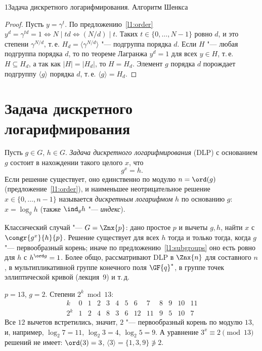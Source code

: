 \begin{lecture}{1}{Задача дискретного логарифмирования. Алгоритм Шенкса}
\begin{proof}
Пусть $y = \gamma^t$. По предложению~\ref{l1:order} $y^d = \gamma^{td} = 1 \iff N \mid td \iff
(N/d) \mid t$. Таких $t \in \{0, \dots, N - 1\}$ ровно $d$, и это степени $\gamma^{N/d}$,
т.\,е. $H_d = \langle \gamma^{N/d} \rangle$ "--- подгруппа порядка $d$. Если $H$ "--- любая
подгруппа порядка $d$, то по теореме Лагранжа $y^d = 1$ для всех $y \in H$, т.\,е.
$H \subseteq H_d$, а так как $|H| = |H_d|$, то $H = H_d$. Элемент $g$ порядка $d$ порождает
подгруппу $\langle g \rangle$ порядка $d$, т.\,е. $\langle g \rangle = H_d$.
\end{proof}


\section{Задача дискретного логарифмирования}

\begin{definition}
Пусть $g \in G$, $h \in G$. \emph{Задача дискретного логарифмирования} (DLP) с основанием $g$
состоит в нахождении такого целого $x$, что
\[
  g^x = h.
\]
Если решение существует, оно единственно по модулю $n = \ord(g)$ (предложение~\ref{l1:order}),
и наименьшее неотрицательное решение $x \in \{0, \dots, n - 1\}$ называется \emph{дискретным
логарифмом} $h$ по основанию $g$: $x = \log_g h$ (также $\ind_g h$ "--- \emph{индекс}).
\end{definition}

Классический случай "--- $G = \Znx{p}$: дано простое $p$ и вычеты $g, h$, найти $x$ с
$\congr{g^x}{h}{p}$. Решение существует для всех $h$ тогда и только тогда, когда $g$ "---
первообразный корень; иначе по предложению~\ref{l1:subgroups} оно есть ровно для $h$ с
$h^{\ord g} = 1$. Более общо, рассматривают DLP в $\Znx{n}$ для составного $n$, в мультипликативной
группе конечного поля $\GF{q}^*$, в группе точек эллиптической кривой (лекция~9) и т.\,д.

\begin{example}\label{l1:ex13}
$p = 13$, $g = 2$. Степени $2^k \bmod 13$:
\[
\begin{array}{c|cccccccccccc}
  k & 0 & 1 & 2 & 3 & 4 & 5 & 6 & 7 & 8 & 9 & 10 & 11 \\ \hline
  2^k & 1 & 2 & 4 & 8 & 3 & 6 & 12 & 11 & 9 & 5 & 10 & 7
\end{array}
\]
Все $12$ вычетов встретились, значит, $2$ "--- первообразный корень по модулю $13$, и, например,
$\log_2 7 = 11$, $\log_2 3 = 4$, $\log_2 5 = 9$. А уравнение $3^x \equiv 2 \pmod{13}$ решений
не имеет: $\ord(3) = 3$, $\langle 3 \rangle = \{1, 3, 9\} \not\ni 2$.
\end{example}


\end{lecture}
